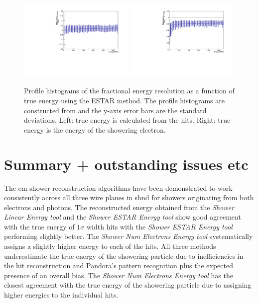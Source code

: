 \begin{figure}[h!]
    \centering
    \includegraphics[width = 0.49\textwidth]{figures-chap4/frac_res_vs_energy_cheating_electron_vertex_plane2_ESTAR_profile.pdf}
    \includegraphics[width = 0.49\textwidth]{figures-chap4/frac_res_vs_energy_cheating_electron_vertex_plane2_ESTAR_showeringE_profile.pdf}
    \caption[Profile histograms of the fractional energy resolution as a function of true energy.]{Profile histograms of the fractional energy resolution as a function of true energy using the ESTAR method. The profile histograms are constructed from  and the y-axis error bars are the standard deviations.  Left: true energy is calculated from the hits. Right: true energy is the energy of the showering electron.}
    \label{fig:reconstruction_as_a_function_of_energy_profile}
\end{figure}



\newpage

\section{Summary + outstanding issues etc}

The \gls{em} shower reconstruction algorithms have been demonstrated to work consistently across all three wire planes in \gls{sbnd} for showers originating from both electrons and photons. The reconstructed energy obtained from the \textit{Shower Linear Energy tool} and the \textit{Shower ESTAR Energy tool} show good agreement with the true energy of $1 \sigma$ width hits with the \textit{Shower ESTAR Energy tool} performing slightly better. The \textit{Shower Num Electrons Energy tool} systematically assigns a slightly higher energy to each of the hits. All three methods underestimate the true energy of the showering particle due to inefficiencies in the hit reconstruction and Pandora's pattern recognition plus the expected presence of an overall bias. The \textit{Shower Num Electrons Energy tool} has the closest agreement with the true energy of the showering particle due to assigning higher energies to the individual hits.

